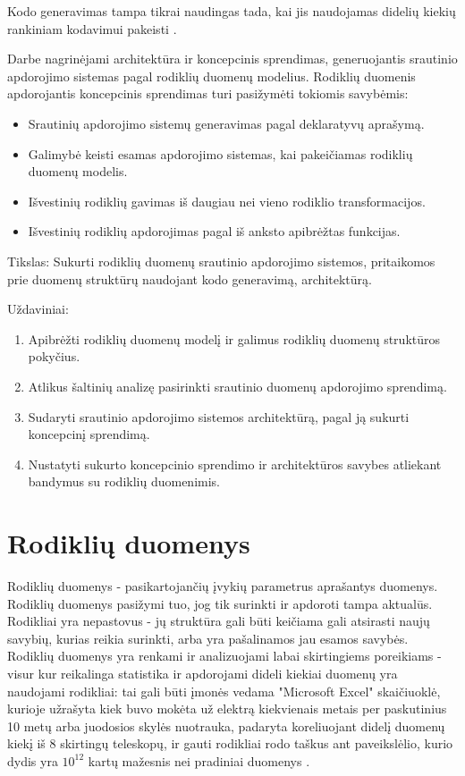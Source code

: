 \documentclass{VUMIFPSbakalaurinis}
\begin{document}
Kodo generavimas tampa tikrai naudingas tada, kai jis naudojamas didelių kiekių rankiniam kodavimui pakeisti \cite{herrington2003code}. \par
Darbe nagrinėjami architektūra ir koncepcinis sprendimas, generuojantis srautinio apdorojimo sistemas pagal rodiklių duomenų modelius. Rodiklių duomenis apdorojantis koncepcinis sprendimas turi pasižymėti tokiomis savybėmis: 
\begin{itemize}
    \item Srautinių apdorojimo sistemų generavimas pagal deklaratyvų aprašymą.
    \item Galimybė keisti esamas apdorojimo sistemas, kai pakeičiamas rodiklių duomenų modelis.
    \item Išvestinių rodiklių gavimas iš daugiau nei vieno rodiklio transformacijos.
    \item Išvestinių rodiklių apdorojimas pagal iš anksto apibrėžtas funkcijas.
\end{itemize}  

Tikslas: Sukurti rodiklių duomenų srautinio apdorojimo sistemos, pritaikomos prie duomenų struktūrų naudojant kodo generavimą, architektūrą.

Uždaviniai:
\begin{enumerate}
    \item Apibrėžti rodiklių duomenų modelį ir galimus rodiklių duomenų struktūros pokyčius.
    \item Atlikus šaltinių analizę pasirinkti srautinio duomenų apdorojimo sprendimą.
    \item Sudaryti srautinio apdorojimo sistemos architektūrą, pagal ją sukurti koncepcinį sprendimą. 
    \item Nustatyti sukurto koncepcinio sprendimo ir architektūros savybes atliekant bandymus su rodiklių duomenimis.
\end{enumerate}

\section{Rodiklių duomenys}

Rodiklių duomenys - pasikartojančių įvykių parametrus aprašantys duomenys. Rodiklių duomenys pasižymi tuo, jog tik surinkti ir apdoroti tampa aktualūs. Rodikliai yra nepastovus - jų struktūra gali būti keičiama gali atsirasti naujų savybių, kurias reikia surinkti, arba yra pašalinamos jau esamos savybės. Rodiklių duomenys yra renkami ir analizuojami labai skirtingiems poreikiams - visur kur reikalinga statistika ir apdorojami dideli kiekiai duomenų yra naudojami rodikliai: tai gali būti įmonės vedama "Microsoft Excel" skaičiuoklė, kurioje užrašyta kiek buvo mokėta už elektrą kiekvienais metais per paskutinius 10 metų arba juodosios skylės nuotrauka, padaryta koreliuojant didelį duomenų kiekį iš 8 skirtingų teleskopų, ir gauti rodikliai rodo taškus ant paveikslėlio, kurio dydis yra \(10^{12}\) kartų mažesnis nei pradiniai duomenys \cite{akiyama2019first}.
\end{document}
